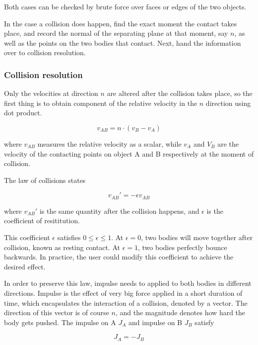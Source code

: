 \documentclass[runningheads]{llncs}
\begin{document}
Both cases can be checked by brute force over faces or edges of the two objects.

In the case a collision does happen, find the exact moment the contact takes place, and record the normal of the separating plane at that moment, say $n$, as well as the points on the two bodies that contact. Next, hand the information over to collision resolution.

\subsubsection{Collision resolution}

Only the velocities at direction $n$ are altered after the collision takes place, so the first thing is to obtain component of the relative velocity in the $n$ direction using dot product.

\begin{equation}
v_{AB} = n \cdot (v_B - v_A)
\end{equation}

where $v_{AB}$ measures the relative velocity as a scalar, while $v_A$ and $V_B$ are the velocity of the contacting points on object A and B respectively at the moment of collision.

The law of collisions states

\begin{equation}
v_{AB}' = -\epsilon v_{AB}
\end{equation}

where $v_{AB}'$ is the same quantity after the collision happens, and $\epsilon$ is the coefficient of resititution.

This coefficient $\epsilon$ satisfies $0 \leq \epsilon \leq 1$. At $\epsilon = 0$, two bodies will move together after collision, known as resting contact. At $\epsilon = 1$, two bodies perfectly bounce backwards. In practice, the user could modify this coefficient to achieve the desired effect.

In order to preserve this law, impulse needs to applied to both bodies in different directions. Impulse is the effect of very big force applied in a short duration of time, which encapsulates the interaction of a collision, denoted by a vector. The direction of this vector is of course $n$, and the magnitude denotes how hard the body gets pushed. The impulse on A $J_A$ and impulse on B $J_B$ satisfy

\begin{equation}
J_A = -J_B
\end{equation}
\end{document}
